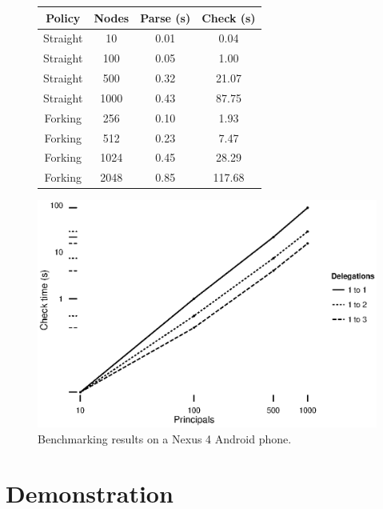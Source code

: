 \documentclass[]{llncs}
\begin{document}
\begin{figure}
  \begin{minipage}{0.49\linewidth}
    \begin{tabular}{c c c c}
       \toprule
       Policy   & Nodes & Parse (s) & Check (s) \\
       \midrule
       Straight & 10    & 0.01      & 0.04      \\
       Straight & 100   & 0.05      & 1.00      \\
       Straight & 500   & 0.32      & 21.07     \\
       Straight & 1000  & 0.43      & 87.75     \\
       \midrule
       Forking  & 256   & 0.10      & 1.93      \\
       Forking  & 512   & 0.23      & 7.47      \\
       Forking  & 1024  & 0.45      & 28.29     \\
       Forking  & 2048  & 0.85      & 117.68    \\
       \bottomrule
    \end{tabular}
  \end{minipage}
  \begin{minipage}{0.49\linewidth}
    \includegraphics[width=\linewidth]{figures/benchmarks.eps}
  \end{minipage}
  \caption{Benchmarking results on a Nexus 4 Android phone.}
  \label{fig:benchmarks}
\end{figure}

\section{Demonstration}
\label{sec:demonstation}
\end{document}
